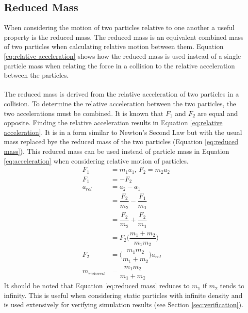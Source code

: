 \documentclass[a4paper,11pt,titlepage]{report}
\begin{document}
\subsection{Reduced Mass}
When considering the motion of two particles relative to one another a useful property is the reduced mass. The reduced mass is an equivalent combined mass of two particles when calculating relative motion between them. Equation \ref{eq:relative acceleration} shows how the reduced mass is used instead of a single particle mass when relating the force in a collision to the relative acceleration between the particles.
\\\\The reduced mass is derived from the relative acceleration of two particles in a collision. To determine the relative acceleration between the two particles, the two accelerations must be combined. It is known that $F_1$ and $F_2$ are equal and opposite. Finding the relative acceleration results in Equation \ref{eq:relative acceleration}. It is in a form similar to Newton's Second Law but with the usual mass replaced bye the reduced mass of the two particles (Equation \ref{eq:reduced mass}). This reduced mass can be used instead of particle mass in Equation \ref{eq:acceleration} when considering relative motion of particles.
\begin{align}
F_1 &= m_1 a_1 \nonumber \text{, } F_2 = m_2 a_2 \nonumber
\\F_1 &= -F_2 \nonumber
\\a_{rel} &= a_2 - a_1 \nonumber
\\&= \dfrac{F_2}{m_2} - \dfrac{F_1}{m_1} \nonumber
\\&= \dfrac{F_2}{m_2} + \dfrac{F_2}{m_1} \nonumber
\\&= F_2 \Big(\dfrac{m_1 + m_2}{m_1 m_2}\Big) \nonumber
\\F_2 &= \Big(\dfrac{m_1 m_2}{m_1 + m_2}\Big) a_{rel} \label{eq:relative acceleration}
\\m_{reduced} &= \dfrac{m_1 m_2}{m_1 + m_2} \label{eq:reduced mass}
\end{align}
It should be noted that Equation \ref{eq:reduced mass} reduces to $m_1$ if $m_2$ tends to infinity. This is useful when considering static particles with infinite density and is used extensively for verifying simulation results (see Section \ref{sec:verification}).
\end{document}
